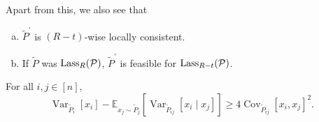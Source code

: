 Apart from this, we also see that
\begin{enumerate}[(a)]
	\item \(\widetilde{P} ^\prime \) is \((R-t)\)-wise locally consistent.
	\item If \(\widetilde{P} \) was \(\mathop{\mathrm{Lass}}_R(\mathcal{\MakeUppercase{p}})\), \(\widetilde{P} ^\prime \) is feasible for \(\mathop{\mathrm{Lass}}_{R-t} (\mathcal{\MakeUppercase{p}})\).
\end{enumerate}

\begin{lemma}\label{lma:conditioning-reduces-variance}
	For all \(i, j\in [n]\),
	\[
		\mathop{\mathrm{Var}}\nolimits_{\widetilde{P} _i}\left[x_i \right] - \mathbb{E}_{x_j\sim \widetilde{P} _j}\left[\mathop{\mathrm{Var}}\nolimits_{\widetilde{P} _{ij}}\left[x_i \mid x_j \right]  \right] \geq 4\mathop{\mathrm{Cov}}\nolimits_{\widetilde{P} _{ij}}\left[ x_i, x_j\right] ^{2} .
	\]
\end{lemma}
